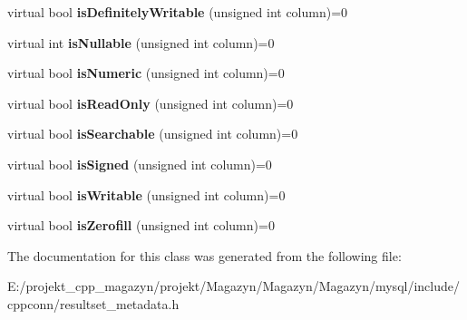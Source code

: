 \begin{DoxyCompactItemize}
virtual bool {\bfseries is\+Definitely\+Writable} (unsigned int column)=0
\item 
\hypertarget{classsql_1_1_result_set_meta_data_a6d08fdd9887ee7803a57f0359655e7b3}{}\label{classsql_1_1_result_set_meta_data_a6d08fdd9887ee7803a57f0359655e7b3} 
virtual int {\bfseries is\+Nullable} (unsigned int column)=0
\item 
\hypertarget{classsql_1_1_result_set_meta_data_a8cc4778fb6bdf419bc8e79ec5d95e5d9}{}\label{classsql_1_1_result_set_meta_data_a8cc4778fb6bdf419bc8e79ec5d95e5d9} 
virtual bool {\bfseries is\+Numeric} (unsigned int column)=0
\item 
\hypertarget{classsql_1_1_result_set_meta_data_a76d96f0a9691c5dfb7f7dc8f111993b2}{}\label{classsql_1_1_result_set_meta_data_a76d96f0a9691c5dfb7f7dc8f111993b2} 
virtual bool {\bfseries is\+Read\+Only} (unsigned int column)=0
\item 
\hypertarget{classsql_1_1_result_set_meta_data_a8c22b12cc56b1d63e1d23f99acd076d0}{}\label{classsql_1_1_result_set_meta_data_a8c22b12cc56b1d63e1d23f99acd076d0} 
virtual bool {\bfseries is\+Searchable} (unsigned int column)=0
\item 
\hypertarget{classsql_1_1_result_set_meta_data_a9c1d41a31cfcb83384780c142df35b23}{}\label{classsql_1_1_result_set_meta_data_a9c1d41a31cfcb83384780c142df35b23} 
virtual bool {\bfseries is\+Signed} (unsigned int column)=0
\item 
\hypertarget{classsql_1_1_result_set_meta_data_ab436abcbb29cacc62b6a75e1968d8ed9}{}\label{classsql_1_1_result_set_meta_data_ab436abcbb29cacc62b6a75e1968d8ed9} 
virtual bool {\bfseries is\+Writable} (unsigned int column)=0
\item 
\hypertarget{classsql_1_1_result_set_meta_data_aa10f7fcdc602649a6c7e5f77d34f785c}{}\label{classsql_1_1_result_set_meta_data_aa10f7fcdc602649a6c7e5f77d34f785c} 
virtual bool {\bfseries is\+Zerofill} (unsigned int column)=0
\end{DoxyCompactItemize}


The documentation for this class was generated from the following file\+:\begin{DoxyCompactItemize}
\item 
E\+:/projekt\+\_\+cpp\+\_\+magazyn/projekt/\+Magazyn/\+Magazyn/\+Magazyn/mysql/include/cppconn/resultset\+\_\+metadata.\+h\end{DoxyCompactItemize}
